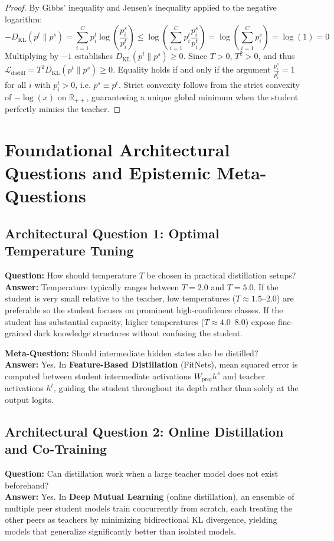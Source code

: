 \documentclass[11pt,a4paper]{article}
\theoremstyle{definition}
\begin{document}
\begin{proof}
By Gibbs' inequality and Jensen's inequality applied to the negative logarithm:
{\boldmath
\begin{equation}
- D_{\text{KL}}(p^t \| p^s) = \sum_{i=1}^C p_i^t \log \left(\frac{p_i^s}{p_i^t}\right) \le \log \left( \sum_{i=1}^C p_i^t \frac{p_i^s}{p_i^t} \right) = \log\left( \sum_{i=1}^C p_i^s \right) = \log(1) = 0
\end{equation}
}
Multiplying by $-1$ establishes $D_{\text{KL}}(p^t \| p^s) \ge 0$.
Since $T > 0$, $T^2 > 0$, and thus $\mathcal{L}_{\text{distill}} = T^2 D_{\text{KL}}(p^t \| p^s) \ge 0$.
Equality holds if and only if the argument $\frac{p_i^s}{p_i^t} = 1$ for all $i$ with $p_i^t > 0$, i.e. $p^s \equiv p^t$.
Strict convexity follows from the strict convexity of $-\log(x)$ on $\mathbb{R}_{++}$, guaranteeing a unique global minimum when the student perfectly mimics the teacher.
\end{proof}

\section{Foundational Architectural Questions and Epistemic Meta-Questions}

\subsection{Architectural Question 1: Optimal Temperature Tuning}
\textbf{Question:} How should temperature $T$ be chosen in practical distillation setups?\\
\textbf{Answer:} Temperature typically ranges between $T = 2.0$ and $T = 5.0$. If the student is very small relative to the teacher, low temperatures ($T \approx 1.5\text{--}2.0$) are preferable so the student focuses on prominent high-confidence classes. If the student has substantial capacity, higher temperatures ($T \approx 4.0\text{--}8.0$) expose fine-grained dark knowledge structures without confusing the student.

\textbf{Meta-Question:} Should intermediate hidden states also be distilled?\\
\textbf{Answer:} Yes. In \textbf{Feature-Based Distillation} (FitNets), mean squared error is computed between student intermediate activations $W_{\text{proj}} h^s$ and teacher activations $h^t$, guiding the student throughout its depth rather than solely at the output logits.

\subsection{Architectural Question 2: Online Distillation and Co-Training}
\textbf{Question:} Can distillation work when a large teacher model does not exist beforehand?\\
\textbf{Answer:} Yes. In \textbf{Deep Mutual Learning} (online distillation), an ensemble of multiple peer student models train concurrently from scratch, each treating the other peers as teachers by minimizing bidirectional KL divergence, yielding models that generalize significantly better than isolated models.
\end{document}
